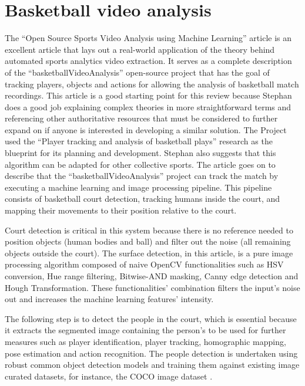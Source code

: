 \documentclass[
11pt,
twoside
]{report}
\begin{document}
\section{Basketball video analysis}


The ``Open Source Sports Video Analysis using Machine Learning'' article \cite{stephan} is an excellent article that lays out a real-world application of the theory behind automated sports analytics video extraction. It serves as a complete description of the ``basketballVideoAnalysis'' open-source project \cite{stephan_code} that has the goal of tracking players, objects and actions for allowing the analysis of basketball match recordings. This article is a good starting point for this review because Stephan does a good job explaining complex theories in more straightforward terms and referencing other authoritative resources that must be considered to further expand on if anyone is interested in developing a similar solution. The Project used the ``Player tracking and analysis of basketball plays'' \cite{baskettrack} research as the blueprint for its planning and development. Stephan also suggests that this algorithm can be adapted for other collective sports. The article \cite{stephan} goes on to describe that the ``basketballVideoAnalysis'' project can track the match by executing a machine learning and image processing pipeline. This pipeline consists of basketball court detection, tracking humans inside the court, and mapping their movements to their position relative to the court.


Court detection is critical in this system because there is no reference needed to position objects (human bodies and ball) and filter out the noise (all remaining objects outside the court). The surface detection, in this article, is a pure image processing algorithm composed of naive OpenCV \cite{opencv} functionalities such as HSV conversion, Hue range filtering, Bitwise-AND masking, Canny edge detection and Hough Transformation. These functionalities' combination filters the input's noise out and increases the machine learning features' intensity.


The following step is to detect the people in the court, which is essential because it extracts the segmented image containing the person's to be used for further measures such as player identification, player tracking, homographic mapping, pose estimation and action recognition. The people detection is undertaken using robust common object detection models and training them against existing image curated datasets, for instance, the COCO image dataset \cite{cocodataset}.
\end{document}
